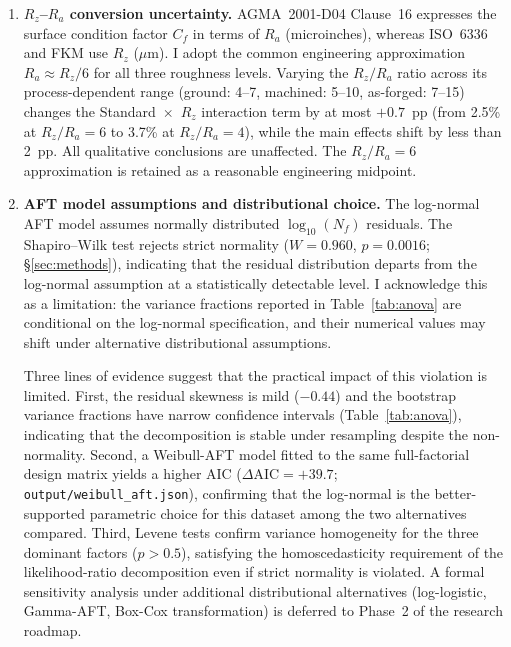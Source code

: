 \documentclass[12pt,a4paper]{article}
\begin{document}
\begin{enumerate}
        the cap introduces negligible bias. The cap is retained because
        it reflects the standard's stated validity range; extrapolating
        beyond $R_z = 40~\mu$m would exceed the ISO specification.
  \item \textbf{$R_z$--$R_a$ conversion uncertainty.} AGMA~2001-D04
        Clause~16 expresses the surface condition factor $C_f$ in terms
        of $R_a$ (microinches), whereas ISO~6336 and FKM use $R_z$
        ($\mu$m). I adopt the common engineering approximation
        $R_a \approx R_z/6$ for all three roughness levels. Varying the
        $R_z/R_a$ ratio across its process-dependent range (ground: 4--7,
        machined: 5--10, as-forged: 7--15) changes the
        Standard~$\times$~$R_z$ interaction term by at most $+0.7$~pp
        (from 2.5\% at $R_z/R_a=6$ to 3.7\% at $R_z/R_a=4$), while the
        main effects shift by less than 2~pp. All qualitative
        conclusions are unaffected. The $R_z/R_a=6$ approximation is
        retained as a reasonable engineering midpoint.
  \item \textbf{AFT model assumptions and distributional choice.} The
        log-normal AFT model assumes normally distributed
        $\log_{10}(N_f)$ residuals. The Shapiro--Wilk test rejects
        strict normality ($W=0.960$, $p=0.0016$; \S\ref{sec:methods}),
        indicating that the residual distribution departs from the
        log-normal assumption at a statistically detectable level.
        I acknowledge this as a limitation: the variance fractions
        reported in Table~\ref{tab:anova} are conditional on the
        log-normal specification, and their numerical values may shift
        under alternative distributional assumptions.

        Three lines of evidence suggest that the practical impact of this
        violation is limited. First, the residual skewness is mild
        ($-0.44$) and the bootstrap variance fractions have narrow
        confidence intervals (Table~\ref{tab:anova}), indicating that the
        decomposition is stable under resampling despite the non-normality.
        Second, a Weibull-AFT model fitted to the same full-factorial
        design matrix yields a higher AIC ($\Delta\mathrm{AIC} = +39.7$;
        \texttt{output/weibull\_aft.json}), confirming that the
        log-normal is the better-supported parametric choice for this
        dataset among the two alternatives compared. Third, Levene tests
        confirm variance homogeneity for the three dominant factors
        ($p > 0.5$), satisfying the homoscedasticity requirement of the
        likelihood-ratio decomposition even if strict normality is
        violated. A formal sensitivity analysis under additional
        distributional alternatives (log-logistic, Gamma-AFT, Box-Cox
        transformation) is deferred to Phase~2 of the research roadmap.


\end{enumerate}
\end{document}
